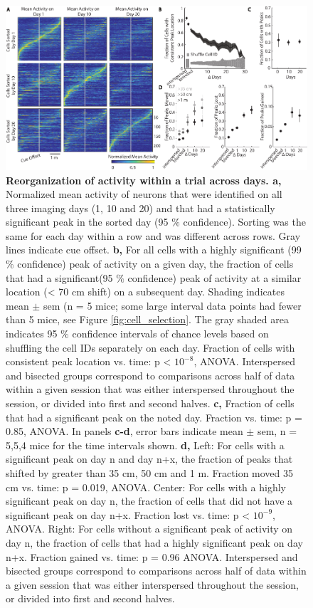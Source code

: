 \begin{figure}
\includegraphics[width=\textwidth]{figures/2_all.pdf}
\caption[Reorganization of activity within a trial across days.]{\textbf{Reorganization of activity within a trial across days. a,} Normalized mean activity of neurons that were identified on all three imaging days (1, 10 and 20) and that had a statistically significant peak in the sorted day (95 $\%$ confidence). Sorting was the same for each day within a row and was different across rows. Gray lines indicate cue offset.
%
\textbf{b,} For all cells with a highly significant (99 $\%$ confidence) peak of activity on a given day, the fraction of cells that had a significant(95 $\%$ confidence) peak of activity at a similar location (< 70 cm shift) on a subsequent day. Shading indicates mean $\pm$ sem (n = 5 mice; some large interval data points had fewer than 5 mice, see Figure \ref{fig:cell_selection}. The gray shaded area indicates 95 $\%$ confidence intervals of chance levels based on shuffling the cell IDs separately on each day. Fraction of cells with consistent peak location vs. time: p < $10^{-8}$, ANOVA. Interspersed and bisected groups correspond to comparisons across half of data within a given session that was either interspersed throughout the session, or divided into first and second halves.
%
\textbf{c,} Fraction of cells that had a significant peak on the noted day.  Fraction vs. time: p =  0.85, ANOVA. In panels \textbf{c-d}, error bars indicate mean $\pm$ sem, n = 5,5,4 mice for the time intervals shown.
%
\textbf{d,} Left: For cells with a significant peak on day n and day n+x, the fraction of peaks that shifted by greater than 35 cm, 50 cm and 1 m. Fraction moved 35 cm vs. time: p = 0.019, ANOVA. Center: For cells with a highly significant peak on day n, the fraction of cells that did not have a significant peak on day n+x. Fraction lost vs. time: p < $10^{-9}$, ANOVA. Right: For cells without a significant peak of activity on day n, the fraction of cells that had a highly significant peak on day n+x.  Fraction gained vs. time: p = 0.96 ANOVA.  Interspersed and bisected groups correspond to comparisons across half of data within a given session that was either interspersed throughout the session, or divided into first and second halves.
\label{fig:2_all}}
\end{figure}

